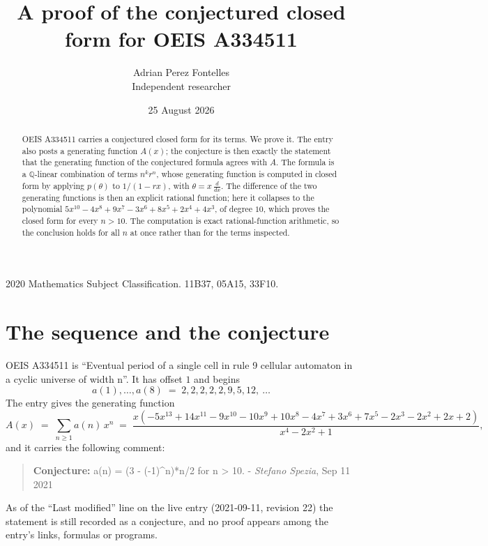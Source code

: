 \documentclass[11pt,a4paper]{article}
\title{A proof of the conjectured closed form for OEIS A334511}
\author{Adrian Perez Fontelles\\ \small Independent researcher}
\date{25 August 2026}
\theoremstyle{plain}
\theoremstyle{definition}
\begin{document}
\maketitle

\begin{abstract}
OEIS A334511 carries a conjectured closed form for its terms. We prove it. The entry
also posts a generating function $A(x)$; the conjecture is then exactly the statement
that the generating function of the conjectured formula agrees with $A$. The formula is
a $\mathbb{Q}$-linear combination of terms $n^{k}r^{n}$, whose generating function is
computed in closed form by applying $p(\theta)$ to $1/(1-rx)$, with
$\theta=x\,\frac{d}{dx}$. The difference of the two generating functions is then an
explicit rational function; here it collapses to the polynomial $5 x^{10} - 4 x^{8} + 9 x^{7} - 3 x^{6} + 8 x^{5} + 2 x^{4} + 4 x^{3}$, of degree
$10$, which proves the closed form for every $n>10$. The computation is exact
rational-function arithmetic, so the conclusion holds for all $n$ at once rather than
for the terms inspected.
\end{abstract}

\noindent\small 2020 Mathematics Subject Classification. 11B37, 05A15, 33F10.\normalsize

\section{The sequence and the conjecture}

OEIS A334511 is ``Eventual period of a single cell in rule 9 cellular automaton in a cyclic universe of width n''. It has offset $1$ and begins
\[
a(1),\dots,a(8)\;=\;2, 2, 2, 2, 2, 9, 5, 12,\ \dots
\]
The entry gives the generating function
\begin{equation}\label{eq:gf}
A(x)\;=\;\sum_{n\ge 1} a(n)\,x^{n}\;=\;\frac{x \left(- 5 x^{13} + 14 x^{11} - 9 x^{10} - 10 x^{9} + 10 x^{8} - 4 x^{7} + 3 x^{6} + 7 x^{5} - 2 x^{3} - 2 x^{2} + 2 x + 2\right)}{x^{4} - 2 x^{2} + 1} ,
\end{equation}
and it carries the following comment:
\begin{quote}\small
\textbf{Conjecture:} a(n) = (3 - (-1)\^{}n)*n/2 for n > 10. - \emph{Stefano Spezia}, Sep 11 2021
\end{quote}
As of the ``Last modified'' line on the live entry (2021-09-11, revision 22) the
statement is still recorded as a conjecture, and no proof appears among the entry's links,
formulas or programs.
\end{document}
